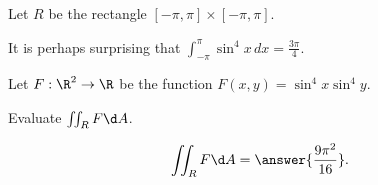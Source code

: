 \documentclass{ximera}
\author{Jim Fowler}
\begin{document}
\begin{exercise}
  Let $R$ be the rectangle $[-\pi,\pi] \times [-\pi,\pi]$.

  It is perhaps surprising that $\int_{-\pi}^{\pi} \sin^4 x \, dx = \frac{3\pi}{4}$.

  Let $F : \R^2 \to \R$ be the function $F(x,y) = \sin^4 x \sin^4 y$.
  
  Evaluate $\iint_R F \d A$.
  \begin{prompt}
    \[
      \iint_R F \d A = \answer{\frac{9 \pi^2}{16}}.
    \]
  \end{prompt}
  
\end{exercise}
\end{document}
